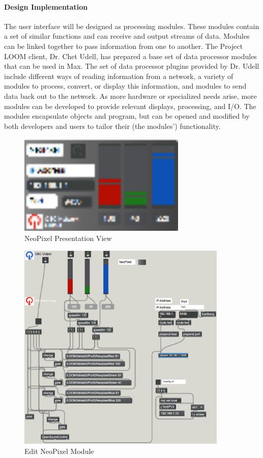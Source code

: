 \documentclass[onecolumn, draftclsnofoot,10pt, compsoc]{IEEEtran}
\begin{document}
\paragraph{Design Implementation}
    The user interface will be designed as processing modules. These modules contain a set of similar functions and can receive and output streams of data. Modules can be linked together to pass information from one to another. The Project LOOM client, Dr. Chet Udell, has prepared a base set of data processor modules that can be used in Max. The set of data processor plugins provided by Dr. Udell include different ways of reading information from a network, a variety of modules to process, convert, or display this information, and modules to send data back out to the network. As more hardware or specialized needs arise, more modules can be developed to provide relevant displays, processing, and I/O. The modules encapsulate objects and program, but can be opened and modified by both developers and users to tailor their (the modules') functionality.

    \begin{figure}[H]
        \centering
        \caption{NeoPixel Presentation View}
        \label{fig:neopixel_pres}
        \includegraphics[width=8cm]{neopixel_presentation.eps}         
     \end{figure}

     \begin{figure}[H]
        \centering
        \caption{Edit NeoPixel Module}
        \label{fig:neopixel_edit}
        \includegraphics[width=10cm]{neopixel_edit.eps}         
     \end{figure}
\end{document}
